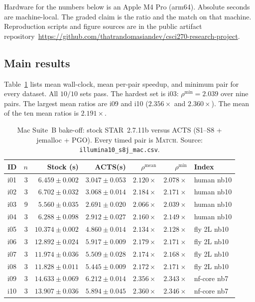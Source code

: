 \documentclass[11pt]{article}
\newcommand{\STAR}{STAR\xspace}
\newcommand{\ACTS}{ACTS\xspace}
\begin{document}
Hardware for the numbers below is an Apple M4 Pro (arm64).
Absolute seconds are machine-local.
The graded claim is the ratio and the match on that machine.
Reproduction scripts and figure sources are in the public artifact
repository~\url{https://github.com/thatrandomasiandev/csci270-research-project}.

\subsection{Main results}
\label{sec:results}

Table~\ref{tab:suiteb} lists mean wall-clock, mean per-pair speedup, and
minimum pair for every dataset.
All $10/10$ sets pass.
The hardest set is i03: $\rho^{\min}=2.039$ over nine pairs.
The largest mean ratios are i09 and i10 ($2.356\times$ and $2.360\times$).
The mean of the ten mean ratios is $2.191\times$.

\begin{table}[t]
\centering
\caption{Mac Suite~B bake-off: stock \STAR~2.7.11b versus \ACTS
(S1--S8 + jemalloc + PGO).
Every timed pair is \textsc{Match}.
Source: \texttt{illumina10\_s8j\_mac.csv}.}
\label{tab:suiteb}
\scriptsize
\setlength{\tabcolsep}{3.5pt}
\begin{tabular}{@{}lrrrrrl@{}}
\toprule
ID & $n$ & Stock (s) & \ACTS (s) & $\rho^{\mathrm{mean}}$ & $\rho^{\min}$ & Index \\
\midrule
i01 & 3 & $6.459{\pm}0.002$ & $3.047{\pm}0.053$ & $2.120\times$ & $2.078\times$ & human nb10 \\
i02 & 3 & $6.702{\pm}0.032$ & $3.068{\pm}0.014$ & $2.184\times$ & $2.171\times$ & human nb10 \\
i03 & 9 & $5.560{\pm}0.035$ & $2.691{\pm}0.020$ & $2.066\times$ & $2.039\times$ & human nb10 \\
i04 & 3 & $6.288{\pm}0.098$ & $2.912{\pm}0.027$ & $2.160\times$ & $2.149\times$ & human nb10 \\
i05 & 3 & $10.374{\pm}0.002$ & $4.860{\pm}0.014$ & $2.134\times$ & $2.128\times$ & fly 2L nb10 \\
i06 & 3 & $12.892{\pm}0.024$ & $5.917{\pm}0.009$ & $2.179\times$ & $2.171\times$ & fly 2L nb10 \\
i07 & 3 & $11.974{\pm}0.036$ & $5.509{\pm}0.028$ & $2.174\times$ & $2.168\times$ & fly 2L nb10 \\
i08 & 3 & $11.828{\pm}0.011$ & $5.445{\pm}0.009$ & $2.172\times$ & $2.171\times$ & fly 2L nb10 \\
i09 & 3 & $14.633{\pm}0.069$ & $6.212{\pm}0.014$ & $2.356\times$ & $2.343\times$ & nf-core nb7 \\
i10 & 3 & $13.907{\pm}0.036$ & $5.894{\pm}0.045$ & $2.360\times$ & $2.346\times$ & nf-core nb7 \\
\bottomrule
\end{tabular}
\end{table}
\end{document}
